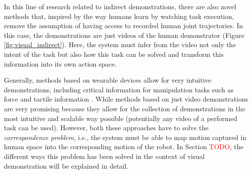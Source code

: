 In this line of research related to indirect demonstrations, there are also novel methods \cite{smith2019avid,torabi2019recent_advances_lfo,xiong2021learning_by_watching,wang2023mimicplay,qian2024contrast} that, inspired by the way humans learn by watching task execution, remove the assumption of having access to recorded human joint trajectories. In this case, the demonstrations are just videos of the human demonstrator (Figure \ref{fig:visual_indirect}). Here, the system must infer from the video not only the intent of the task but also how this task can be solved and transform this information into its own action space.

Generally, methods based on wearable devices allow for very intuitive demonstrations, including critical information for manipulation tasks such as force and tactile information \cite{liu2019_mirroring_without_overimitation}. While methods based on just video demonstrations are very promising because they allow for the collection of demonstrations in the most intuitive and scalable way possible (potentially any video of a performed task can be used). However, both these approaches have to solve the \textit{correspondence problem}, i.e., the system must be able to map motion captured in human space into the corresponding motion of the robot. In Section \textcolor{red}{TODO}, the different ways this problem has been solved in the context of visual demonstration will be explained in detail.

